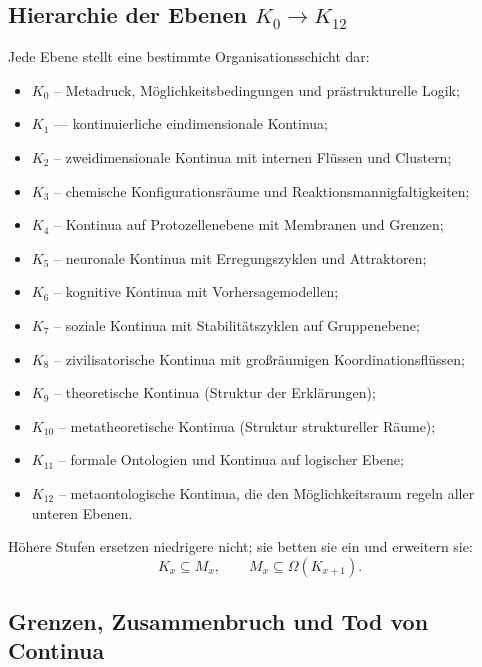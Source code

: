 \subsection{Hierarchie der Ebenen $K_0 \to K_{12}$}

Jede Ebene stellt eine bestimmte Organisationsschicht dar:

\begin{itemize}
    \item $K_0$ – Metadruck, Möglichkeitsbedingungen und prästrukturelle Logik;
    \item $K_1$ — kontinuierliche eindimensionale Kontinua;
    \item $K_2$ – zweidimensionale Kontinua mit internen Flüssen und Clustern;
    \item $K_3$ – chemische Konfigurationsräume und Reaktionsmannigfaltigkeiten;
    \item $K_4$ – Kontinua auf Protozellenebene mit Membranen und Grenzen;
    \item $K_5$ – neuronale Kontinua mit Erregungszyklen und Attraktoren;
    \item $K_6$ – kognitive Kontinua mit Vorhersagemodellen;
    \item $K_7$ – soziale Kontinua mit Stabilitätszyklen auf Gruppenebene;
    \item $K_8$ – zivilisatorische Kontinua mit großräumigen Koordinationsflüssen;
    \item $K_9$ – theoretische Kontinua (Struktur der Erklärungen);
    \item $K_{10}$ – metatheoretische Kontinua (Struktur struktureller Räume);
    \item $K_{11}$ – formale Ontologien und Kontinua auf logischer Ebene;
    \item $K_{12}$ – metaontologische Kontinua, die den Möglichkeitsraum regeln
                     aller unteren Ebenen.
\end{itemize}

Höhere Stufen ersetzen niedrigere nicht; sie betten sie ein und erweitern sie:
\[
K_x \subseteq M_x,
\qquad
M_x \subseteq \Omega(K_{x+1}).
\]


\subsection{Grenzen, Zusammenbruch und Tod von Continua}

